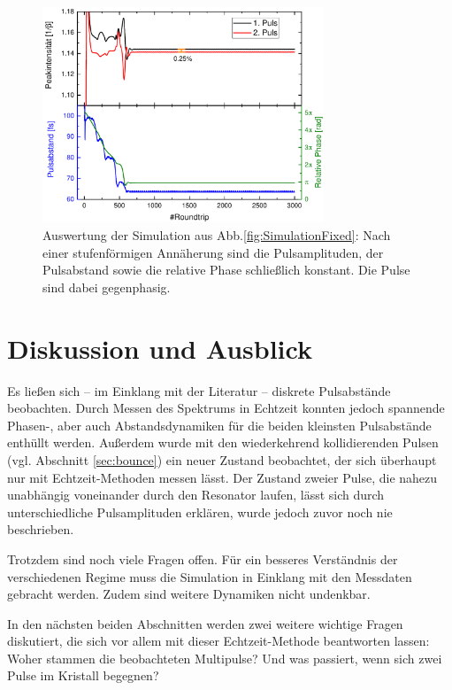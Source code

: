 \documentclass[bachelor,       %
               twoside,        %
               BCOR10mm,       %
               liststotoc,nomtotoc,bibtotoc, %
               english,ngerman, %
               final,          %
               ]{GAUBM}
\begin{document}
\begin{figure}[!htb]
	\centering
	\includegraphics[width=0.75\textwidth]{figures/SimRBFixed}
	\caption{Auswertung der Simulation aus Abb.\ref{fig:SimulationFixed}: Nach einer stufenförmigen Annäherung sind die Pulsamplituden, der Pulsabstand sowie die relative Phase schließlich konstant. Die Pulse sind dabei gegenphasig.}
	\label{fig:SimRBFix}
\end{figure}

\chapter{Diskussion und Ausblick}
Es ließen sich -- im Einklang mit der Literatur -- diskrete Pulsabstände  beobachten.
Durch Messen des Spektrums in Echtzeit konnten jedoch spannende Phasen-, aber auch Abstandsdynamiken für die beiden kleinsten Pulsabstände enthüllt werden.
Außerdem wurde mit den wiederkehrend kollidierenden Pulsen (vgl. Abschnitt \ref{sec:bounce}) ein neuer Zustand beobachtet, der sich überhaupt nur mit Echtzeit-Methoden messen lässt.
Der Zustand zweier Pulse, die nahezu unabhängig voneinander durch den Resonator laufen, lässt sich durch unterschiedliche Pulsamplituden erklären, wurde jedoch zuvor noch nie beschrieben.

Trotzdem sind noch viele Fragen offen.
Für ein besseres Verständnis der verschiedenen Regime muss die Simulation in Einklang mit den Messdaten gebracht werden.
Zudem sind weitere Dynamiken nicht undenkbar.

In den nächsten beiden Abschnitten werden zwei weitere wichtige Fragen diskutiert, die sich vor allem mit dieser Echtzeit-Methode beantworten lassen:
Woher stammen die beobachteten Multipulse? Und was passiert, wenn sich zwei Pulse im Kristall begegnen?
\end{document}
